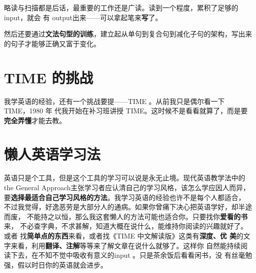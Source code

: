 略读与扫描都是后话，最重要的工作还是广读。读到一个程度，累积了足够的 input，就会
有 output出来——可以拿起笔来\textbf{写}了。

然后还要通过\textbf{文法句型的训练}，建立起从单句到复合句到减化子句的架构，写出来
的句子才能够正确又富于变化。

\section*{TIME 的挑战}

我学英语的经验，还有一个挑战要提——TIME 。从前我只是偶尔看一下 TIME，1980 年
代我开始在补习班讲授 TIME。这时候不是看看就算了，而是要\textbf{完全弄懂}才能去教。

\section*{懒人英语学习法}

英语只是个工具，但是这个工具的学习可以说是永无止境。现代英语教学法中的the
General Approach主张学习者应认清自己的学习风格，该怎么学应因人而异，
要\textbf{选择最适合自己学习风格的方法}。我学习英语的经验也许不是每个人都适合，
不过我觉得，好逸恶劳是大部分人的通病。如果你曾痛下决心把英语学好，却半途而废，
不能持之以恒，那么我这套懒人的方法可能也适合你。只要找你\textbf{爱看的书}来，
不必查字典，不求甚解，知道大概在说什么，能维持你阅读的兴趣就好了。或者
找\textbf{简单点的东西}来看，或者找《TIME 中文解读版》这类有\textbf{深度、优
  美}的文字来看，利用\textbf{翻译、注解}等等来了解文章在说什么就够了。这样你
自然能持续阅读下去，在不知不觉中吸收有意义的input 。只是茶余饭后看看闲书，没
有丝毫勉强，假以时日你的英语就会进步。


